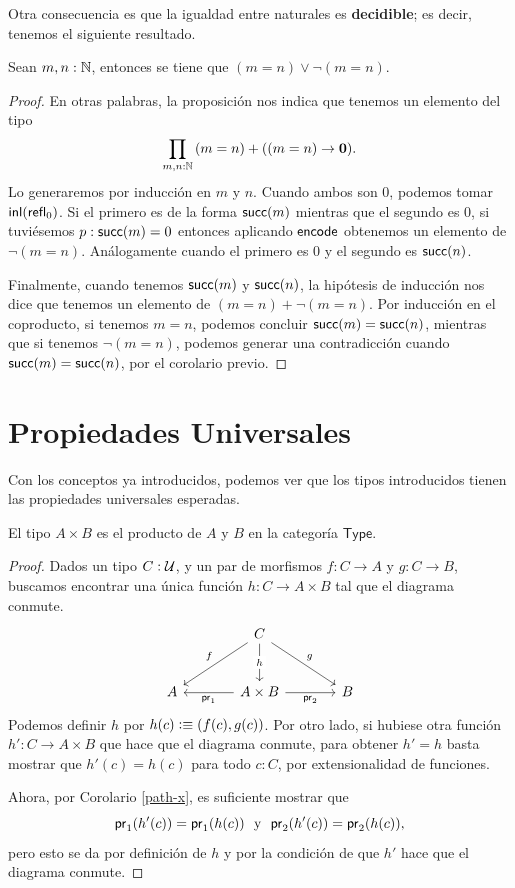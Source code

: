 \documentclass[../main.tex]{subfiles}
\begin{document}
Otra consecuencia es que la igualdad entre naturales es \textbf{decidible}; es decir, tenemos el siguiente resultado.

\begin{corollary}
  Sean $m,n: \mathbb{N}$, entonces se tiene que $(m=n) \vee \lnot (m=n)$.
\end{corollary}
\begin{proof}
  En otras palabras, la proposici\'on nos indica que tenemos un elemento del tipo
  \[ \prd{m,n:\N} (m = n) + ((m=n) \to \emptyt). \]
  Lo generaremos por inducci\'on en $m$ y $n$.
  Cuando ambos son $0$, podemos tomar ${\mathsf{inl}}(\mathsf{refl}_{0})$.
  Si el primero es de la forma $\mathsf{succ}(m)$ mientras que el segundo es 0, si tuvi\'esemos $p:\mathsf{succ}(m)=0$ entonces aplicando $\mathsf{encode}$ obtenemos un elemento de $\lnot (m=n)$.
  An\'alogamente cuando el primero es $0$ y el segundo es $\mathsf{succ}(n)$.

  Finalmente, cuando tenemos $\mathsf{succ}(m)$ y $\mathsf{succ}(n)$, la hipótesis de inducción nos dice que tenemos un elemento de $(m = n) + \lnot (m=n)$.
  Por inducci\'on en el coproducto, si tenemos $m=n$, podemos concluir $\mathsf{succ}(m)=\mathsf{succ}(n)$, mientras que si tenemos $\lnot(m=n)$, podemos generar una contradicción cuando $\mathsf{succ}(m)=\mathsf{succ}(n)$, por el corolario previo.
\end{proof}

\section{Propiedades Universales}\label{univ-prop-sec}
Con los conceptos ya introducidos, podemos ver que los tipos introducidos tienen las propiedades universales esperadas.

\begin{theorem}
  El tipo $A \times B$ es el producto de $A$ y $B$ en la categor\'ia $\mathsf{Type}$.
\end{theorem}
\begin{proof}
  Dados un tipo $C:\mathcal{U}$, y un par de morfismos $f:C \to A$ y $g:C \to B$, buscamos encontrar una \'unica funci\'on $h:C \to A \times B$ tal que el diagrama conmute.
  \[\begin{tikzcd}[row sep=large,column sep=large]
      & C \\
      A & {A \times B} & B
      \arrow["f"', from=1-2, to=2-1]
      \arrow["{\fst}", from=2-2, to=2-1]
      \arrow["g", from=1-2, to=2-3]
      \arrow["{\snd}"', from=2-2, to=2-3]
      \arrow["h"{description}, from=1-2, to=2-2]
    \end{tikzcd}\]
  Podemos definir $h$ por $h(c)\vcentcolon\equiv(f(c),g(c))$. Por otro lado, si hubiese otra funci\'on $h':C \to A\times B$ que hace que el diagrama conmute, para obtener $h'=h$ basta mostrar que $h'(c) = h(c)$ para todo $c:C$, por extensionalidad de funciones.

  Ahora, por Corolario \ref{path-x}, es suficiente mostrar que
  \[ \mathsf{pr}_{1}(h'(c)) = \mathsf{pr}_{1}(h(c)) \,\, \text{ y } \,\, \mathsf{pr}_{2}(h'(c)) = \mathsf{pr}_{2}(h(c)), \]
  pero esto se da por definici\'on de $h$ y por la condici\'on de que $h'$ hace que el diagrama conmute.
\end{proof}
\end{document}

